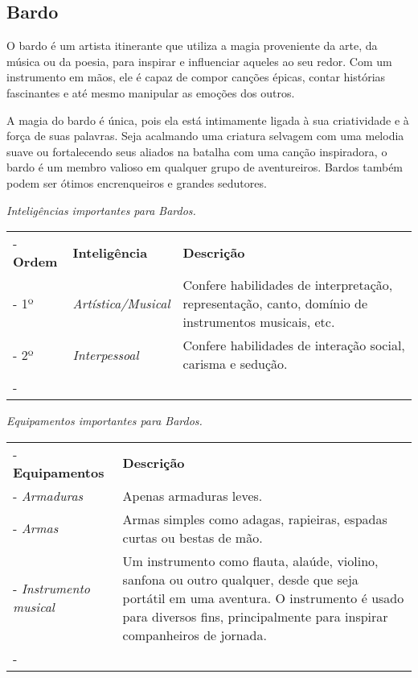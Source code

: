 \subsection*{Bardo}
O bardo é um artista itinerante que utiliza a magia proveniente da arte, da música ou da poesia, para inspirar e influenciar aqueles ao seu redor. Com um instrumento em mãos, ele é capaz de compor canções épicas, contar histórias fascinantes e até mesmo manipular as emoções dos outros. 

A magia do bardo é única, pois ela está intimamente ligada à sua criatividade e à força de suas palavras. Seja acalmando uma criatura selvagem com uma melodia suave ou fortalecendo seus aliados na batalha com uma canção inspiradora, o bardo é um membro valioso em qualquer grupo de aventureiros. Bardos também podem ser ótimos encrenqueiros e grandes sedutores. 

\begin{table}[htb]
	\centering\smaller
	\emph{Inteligências importantes para Bardos.} \\
	\begin{tabu} to \textwidth {|X[c 0.5]|X[1]|X[3]|} \tabucline-
		\textbf{Ordem}	& \textbf{Inteligência}	&	\textbf{Descrição}	\\ \tabucline-
		1º		& \emph{Artística/Musical}  	& Confere habilidades de interpretação, representação, canto, domínio de instrumentos musicais, etc. 	\\ \tabucline-
		2º		& \emph{Interpessoal} & Confere habilidades de interação social, carisma e sedução. \\ \tabucline-
	\end{tabu}
\end{table}

\begin{table}[htb]
	\centering\smaller
	\emph{Equipamentos importantes para Bardos.}
	\begin{tabu} to \textwidth {|X[0.5]|X[3]|} \tabucline-
		\textbf{Equipamentos}	&	\textbf{Descrição}	\\ \tabucline-
		\emph{Armaduras} & Apenas armaduras leves.	\\ \tabucline-
		\emph{Armas} & Armas simples como adagas, rapieiras, espadas curtas ou bestas de mão. \\ \tabucline-
		\emph{Instrumento musical} & Um instrumento como flauta, alaúde, violino, sanfona ou outro qualquer, desde que seja portátil em uma aventura. O instrumento é usado para diversos fins, principalmente para inspirar companheiros de jornada. \\ \tabucline-
	\end{tabu}
\end{table}


